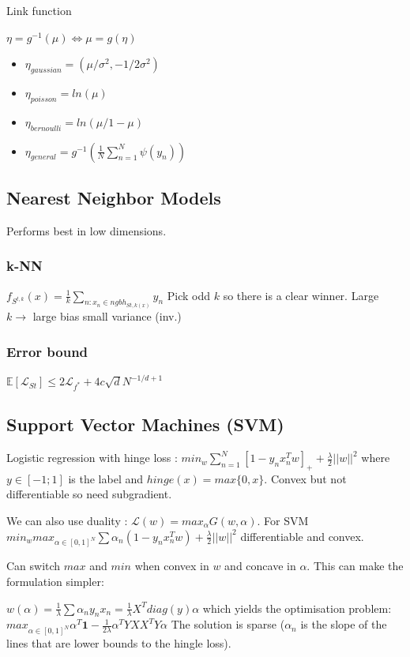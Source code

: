 Link function

$\eta = g^{-1}(\mu) \Leftrightarrow \mu = g(\eta)$

\begin{itemize}
\item $\eta_{gaussian} = (\mu / \sigma^2, - 1 / 2 \sigma^2)$
\item $\eta_{poisson} = ln(\mu)$
\item $\eta_{bernoulli} = ln(\mu / 1 - \mu)$
\item $\eta_{general} = g^{-1}(\frac{1}{N} \sum_{n=1}^N \psi(y_n))$
\end{itemize}

\subsection{Nearest Neighbor Models}
Performs best in low dimensions.
\subsubsection{k-NN}
$f_{S^{t,k}}(x) = \frac{1}{k} \sum_{n:x_n\in ngbh_{S{t,k}(x)}} y_n$
Pick odd $k$ so there is a clear winner.
Large $k \rightarrow$ large bias small variance (inv.)

\subsubsection{Error bound}
$\mathbb{E}[\mathcal{L}_{St}] \le 2 \mathcal{L}_{f^*} + 4 c \sqrt{d} N^{-1/d+1}$

\subsection{Support Vector Machines (SVM)}
Logistic regression with hinge loss :
$min_w \sum_{n=1}^N [1-y_n x_n^T w]_+ + \frac{\lambda}{2} ||w||^2$ where $y \in [-1;1]$ is the label and $hinge(x)= max\{0,x\}$. Convex but not differentiable so need subgradient.

We can also use duality : $\mathcal{L}(w) = max_{\alpha} G(w, \alpha)$. For SVM
$min_{w} max_{\alpha \in [0,1]^N} \sum \alpha_n (1 - y_nx_n^Tw) + \frac{\lambda}{2} ||w||^2$ differentiable and convex.

Can switch $max$ and $min$ when convex in $w$ and concave in $\alpha$. This can make the formulation simpler:

$w(\alpha) = \frac{1}{\lambda} \sum \alpha_n y_n x_n = \frac{1}{\lambda} X^T diag(y) \alpha$ which yields the optimisation problem:
$max_{\alpha \in [0,1]^N} \alpha^T\mathbf{1} - \frac{1}{2\lambda} \alpha^T Y X X^T Y \alpha$
The solution is sparse ($\alpha_n$ is the slope of the lines that are lower bounds to the hingle loss).

